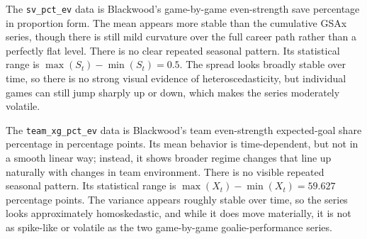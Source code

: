 \documentclass[
  10pt,
]{extarticle}
\begin{document}
The \texttt{sv\_pct\_ev} data is Blackwood's game-by-game even-strength save percentage in proportion form. The mean appears more stable than the cumulative GSAx series, though there is still mild curvature over the full career path rather than a perfectly flat level. There is no clear repeated seasonal pattern. Its statistical range is \(\max(S_t) - \min(S_t) = 0.5\). The spread looks broadly stable over time, so there is no strong visual evidence of heteroscedasticity, but individual games can still jump sharply up or down, which makes the series moderately volatile.

The \texttt{team\_xg\_pct\_ev} data is Blackwood's team even-strength expected-goal share percentage in percentage points. Its mean behavior is time-dependent, but not in a smooth linear way; instead, it shows broader regime changes that line up naturally with changes in team environment. There is no visible repeated seasonal pattern. Its statistical range is \(\max(X_t) - \min(X_t) = 59.627\) percentage points. The variance appears roughly stable over time, so the series looks approximately homoskedastic, and while it does move materially, it is not as spike-like or volatile as the two game-by-game goalie-performance series.
\end{document}
